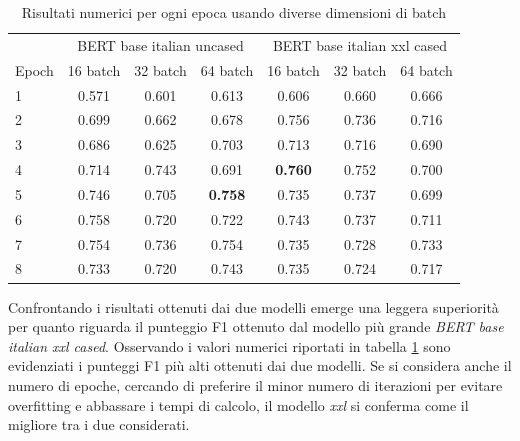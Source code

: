     
    \begin{table}[h!]
        \centering
        \begin{tabular}{@{}lcccccc@{}}
        \toprule
                                  & \multicolumn{3}{c}{BERT base italian uncased} & \multicolumn{3}{c}{BERT base italian xxl cased} \\ 
        \multicolumn{1}{c}{Epoch} & 16 batch  & 32 batch   & 64 batch       & 16 batch          & 32 batch   & 64 batch     \\ \midrule
        1                         & 0.571     & 0.601      & 0.613          & 0.606             & 0.660      & 0.666        \\
        2                         & 0.699     & 0.662      & 0.678          & 0.756             & 0.736      & 0.716        \\
        3                         & 0.686     & 0.625      & 0.703          & 0.713             & 0.716      & 0.690        \\
        4                         & 0.714     & 0.743      & 0.691          & \textbf{0.760}    & 0.752      & 0.700        \\
        5                         & 0.746     & 0.705      & \textbf{0.758} & 0.735             & 0.737      & 0.699        \\
        6                         & 0.758     & 0.720      & 0.722          & 0.743             & 0.737      & 0.711        \\
        7                         & 0.754     & 0.736      & 0.754          & 0.735             & 0.728      & 0.733        \\
        8                         & 0.733     & 0.720      & 0.743          & 0.735             & 0.724      & 0.717        \\ \bottomrule
        \end{tabular}
        \caption{Risultati numerici per ogni epoca usando diverse dimensioni di batch}
        \label{Tab:f1-tab}
    \end{table}
    
    Confrontando i risultati ottenuti dai due modelli emerge una leggera superiorità per quanto riguarda il punteggio F1 ottenuto dal modello più grande \textit{BERT base italian xxl cased}. Osservando i valori numerici riportati in tabella \ref{Tab:f1-tab} sono evidenziati i punteggi F1 più alti ottenuti dai due modelli. Se si considera anche il numero di epoche, cercando di preferire il minor numero di iterazioni per evitare overfitting e abbassare i tempi di calcolo, il modello \textit{xxl} si conferma come il migliore tra i due considerati.
    

